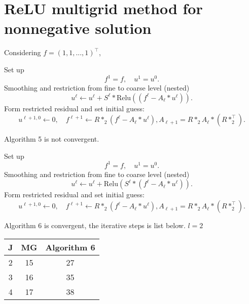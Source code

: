 \section{ReLU multigrid method for nonnegative solution}
Considering $f = (1, 1, ..., 1)^\top$,
\begin{breakablealgorithm}%
	\caption{$(u^{1}, u^2, \cdots, u^J) = {\text{MG0}}(f; u^0; J,\nu_1, \cdots, \nu_J)$}
	\label{alg:L-ReLUSlash0}
	\begin{algorithmic}
		\State Set up
		$$
		f^1 = f, \quad u^{1}=u^0.
		$$
		\State Smoothing and restriction from fine to coarse level (nested)
		\State
		\begin{equation}\label{eq:smoothing}
		u^{\ell} \leftarrow u^{\ell} + S^\ell \ast \text{Relu}( (f^\ell - A_\ell \ast u^{\ell})).
		\end{equation}
		\EndFor
		\State Form restricted residual and set initial guess:
		$$
		u^{\ell+1,0} \leftarrow 0, \quad f^{\ell+1} \leftarrow R \ast_2 (f^\ell -  A_\ell \ast u^{\ell}), A_{\ell+1} = R \ast_2 A_\ell \ast (R\ast_2^\top).
		$$
		\EndFor
	\end{algorithmic}
\end{breakablealgorithm}
Algorithm 5 is not convergent.

\newpage
\begin{breakablealgorithm}%
	\caption{$(u^{1}, u^2, \cdots, u^J) = {\text{MG0}}(f; u^0; J,\nu_1, \cdots, \nu_J)$}
	\label{alg:L-ReLUSlash1}
	\begin{algorithmic}
		\State Set up
		$$
		f^1 = f, \quad u^{1}=u^0.
		$$
		\State Smoothing and restriction from fine to coarse level (nested)
		\For{$\ell = 1:J$}
		\For{$i = 1:\nu_\ell$}
		\State
		\begin{equation}\label{eq:smoothing}
		u^{\ell} \leftarrow u^{\ell} +\text{Relu}( S^\ell \ast  (f^\ell - A_\ell \ast u^{\ell})).
		\end{equation}
		\EndFor
		\State Form restricted residual and set initial guess:
		$$
		u^{\ell+1,0} \leftarrow 0, \quad f^{\ell+1} \leftarrow R \ast_2 (f^\ell -  A_\ell \ast u^{\ell}), A_{\ell+1} = R \ast_2 A_\ell \ast (R\ast_2^\top).
		$$
		\EndFor
	\end{algorithmic}
\end{breakablealgorithm}

Algorithm 6 is convergent, the iterative steps is list below. $l = 2$
\\
\begin{tabular}{c|c|c|}
	J &MG& Algorithm 6\\ \hline
	2 & 15 & 27 \\\hline
	3 & 16 & 35 \\\hline
	4 & 17 & 38 \\\hline
\end{tabular}


